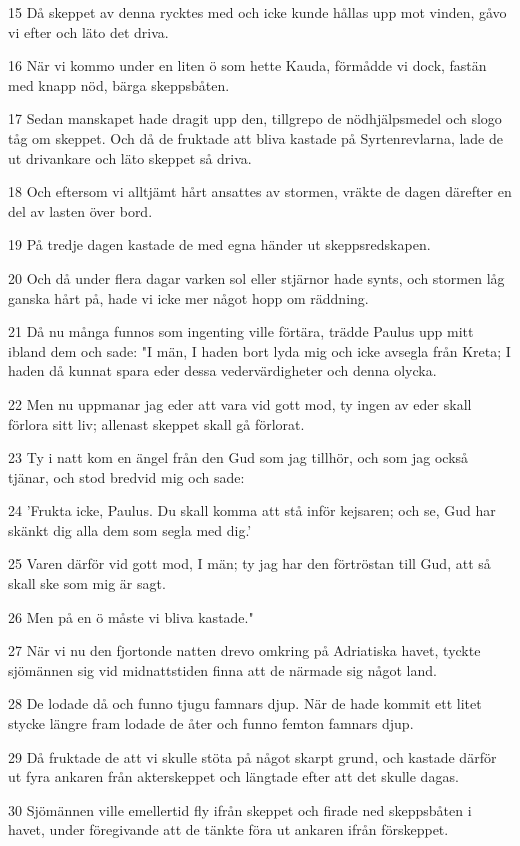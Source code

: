 \par 15 Då skeppet av denna rycktes med och icke kunde hållas upp mot vinden, gåvo vi efter och läto det driva.
\par 16 När vi kommo under en liten ö som hette Kauda, förmådde vi dock, fastän med knapp nöd, bärga skeppsbåten.
\par 17 Sedan manskapet hade dragit upp den, tillgrepo de nödhjälpsmedel och slogo tåg om skeppet. Och då de fruktade att bliva kastade på Syrtenrevlarna, lade de ut drivankare och läto skeppet så driva.
\par 18 Och eftersom vi alltjämt hårt ansattes av stormen, vräkte de dagen därefter en del av lasten över bord.
\par 19 På tredje dagen kastade de med egna händer ut skeppsredskapen.
\par 20 Och då under flera dagar varken sol eller stjärnor hade synts, och stormen låg ganska hårt på, hade vi icke mer något hopp om räddning.
\par 21 Då nu många funnos som ingenting ville förtära, trädde Paulus upp mitt ibland dem och sade: "I män, I haden bort lyda mig och icke avsegla från Kreta; I haden då kunnat spara eder dessa vedervärdigheter och denna olycka.
\par 22 Men nu uppmanar jag eder att vara vid gott mod, ty ingen av eder skall förlora sitt liv; allenast skeppet skall gå förlorat.
\par 23 Ty i natt kom en ängel från den Gud som jag tillhör, och som jag också tjänar, och stod bredvid mig och sade:
\par 24 'Frukta icke, Paulus. Du skall komma att stå inför kejsaren; och se, Gud har skänkt dig alla dem som segla med dig.'
\par 25 Varen därför vid gott mod, I män; ty jag har den förtröstan till Gud, att så skall ske som mig är sagt.
\par 26 Men på en ö måste vi bliva kastade."
\par 27 När vi nu den fjortonde natten drevo omkring på Adriatiska havet, tyckte sjömännen sig vid midnattstiden finna att de närmade sig något land.
\par 28 De lodade då och funno tjugu famnars djup. När de hade kommit ett litet stycke längre fram lodade de åter och funno femton famnars djup.
\par 29 Då fruktade de att vi skulle stöta på något skarpt grund, och kastade därför ut fyra ankaren från akterskeppet och längtade efter att det skulle dagas.
\par 30 Sjömännen ville emellertid fly ifrån skeppet och firade ned skeppsbåten i havet, under föregivande att de tänkte föra ut ankaren ifrån förskeppet.
